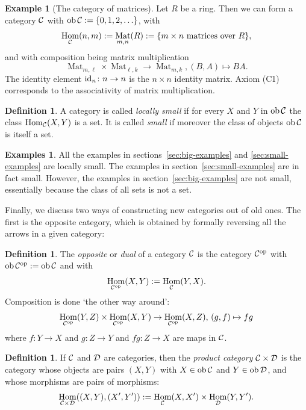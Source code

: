\documentclass[11pt]{amsbook}
\DeclareMathOperator\Hom{Hom}
\DeclareMathOperator\Mat{Mat}
\DeclareMathOperator\ob{ob}
\def\id{{\rm id}}
\def\opp{\mathrm{op}}
\theoremstyle{plain}
\theoremstyle{definition}
\newtheorem{definition}[theorem]{Definition}
\newtheorem{example}[theorem]{Example}
\newtheorem{examples}[theorem]{Examples}
\begin{document}
\begin{example}[The category of matrices] \label{exa:category-of-matrices}
Let $R$ be a ring. Then we can form a category ${\mathcal{C}}$  with $\ob \cC :=\{ 0, 1, 2, \ldots \}$,  with
\[
	\Hom_\cC(n,m) := \Mat_{m,n}(R) := \{ \text{$m\times n$ matrices over $R$} \},
\]
and with composition being matrix multiplication
\[
	 \Mat_{m,\ell} \times \Mat_{\ell,k}  \to \Mat_{m,k}, (B,A) \mapsto BA.
\]
The identity element $\id_n\colon n \to n$ is the $n\times n$ identity matrix. Axiom (C1) corresponds to the associativity of matrix multiplication.
\end{example}

\begin{definition}\label{def:small-category}
A category is called \emph{locally small} if for every $X$ and $Y$ in $\ob \cC$ the class $\Hom_{\cC}(X,Y)$ is a set. It is called \emph{small} if moreover the class of objects $\ob \cC$ is itself a set.
\end{definition}

\begin{examples}
All the examples in sections~\ref{sec:big-examples} and \ref{sec:small-examples} are locally small. The examples in section~\ref{sec:small-examples} are in fact small. However, the examples in section~\ref{sec:big-examples} are not small, essentially because the class of all sets is not a set.
\end{examples}


Finally, we discuss two ways of constructing new categories out of old ones. The first is the opposite category, which is obtained by formally reversing all the arrows in a given category:
 
\begin{definition}\label{def:opposite-category}
The \emph{opposite} or \emph{dual} of a category ${\mathcal{C}}$ is the category $\cC^\opp$ with $\ob \cC^\opp := \ob\cC$ and with
\[
	\Hom_{\cC^\opp}(X,Y) := \Hom_\cC(Y,X).
\]
Composition is done `the other way around': 
\[
	\Hom_{\cC^\opp}(Y,Z) \times \Hom_{\cC^\opp}(X,Y)   \to \Hom_{\cC^\opp}(X,Z),\,
	(g,f) \mapsto fg
\]
where $f\colon Y \to X$ and $g\colon Z\to Y$ and $fg\colon Z \to X$ are maps in ${\mathcal{C}}$.
\end{definition}

\begin{definition}\label{def:product-category}
If ${\mathcal{C}}$ and ${\mathcal{D}}$ are categories, then the \emph{product category}
${\mathcal{C}}\times {\mathcal{D}}$ is the category whose objects are pairs $(X,Y)$ with $X\in \ob \cC$ and $Y\in \ob \cD$, and whose morphisms are pairs of morphisms:
\[
	\Hom_{\cC\times \cD}((X,Y),(X',Y')) := \Hom_\cC(X,X') \times \Hom_\cD(Y,Y').
\]
\end{definition}
\end{document}
